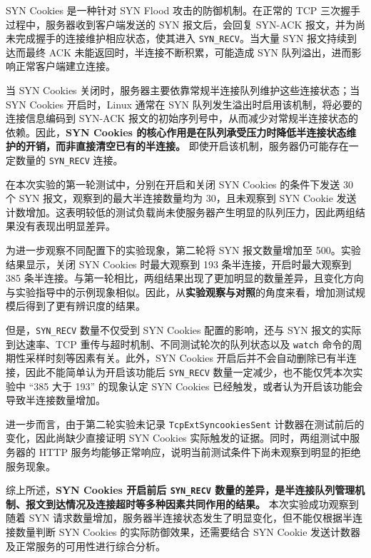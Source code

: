 SYN Cookies 是一种针对 SYN Flood 攻击的防御机制。在正常的 TCP 三次握手过程中，服务器收到客户端发送的 SYN 报文后，会回复 SYN-ACK 报文，并为尚未完成握手的连接维护相应状态，使其进入 \texttt{SYN\_RECV}。当大量 SYN 报文持续到达而最终 ACK 未能返回时，半连接不断积累，可能造成 SYN 队列溢出，进而影响正常客户端建立连接。

当 SYN Cookies 关闭时，服务器主要依靠常规半连接队列维护这些连接状态；当 SYN Cookies 开启时，Linux 通常在 SYN 队列发生溢出时启用该机制，将必要的连接信息编码到 SYN-ACK 报文的初始序列号中，从而减少对常规半连接状态的依赖。因此，\textbf{SYN Cookies 的核心作用是在队列承受压力时降低半连接状态维护的开销，而非直接清空已有的半连接。} 即使开启该机制，服务器仍可能存在一定数量的 \texttt{SYN\_RECV} 连接。

在本次实验的第一轮测试中，分别在开启和关闭 SYN Cookies 的条件下发送 30 个 SYN 报文，观察到的最大半连接数量均为 30，且未观察到 SYN Cookie 发送计数增加。这表明较低的测试负载尚未使服务器产生明显的队列压力，因此两组结果没有表现出明显差异。

为进一步观察不同配置下的实验现象，第二轮将 SYN 报文数量增加至 500。实验结果显示，关闭 SYN Cookies 时最大观察到 193 条半连接，开启时最大观察到 385 条半连接。与第一轮相比，两组结果出现了更加明显的数量差异，且变化方向与实验指导中的示例现象相似。因此，从\textbf{实验观察与对照}的角度来看，增加测试规模后得到了更有辨识度的结果。

但是，\texttt{SYN\_RECV} 数量不仅受到 SYN Cookies 配置的影响，还与 SYN 报文的实际到达速率、TCP 重传与超时机制、不同测试轮次的队列状态以及 \texttt{watch} 命令的周期性采样时刻等因素有关。此外，SYN Cookies 开启后并不会自动删除已有半连接，因此不能简单认为开启该功能后 \texttt{SYN\_RECV} 数量一定减少，也不能仅凭本次实验中 ``385 大于 193'' 的现象认定 SYN Cookies 已经触发，或者认为开启该功能会导致半连接数量增加。

进一步而言，由于第二轮实验未记录 \texttt{TcpExtSyncookiesSent} 计数器在测试前后的变化，因此尚缺少直接证明 SYN Cookies 实际触发的证据。同时，两组测试中服务器的 HTTP 服务均能够正常响应，说明当前测试条件下尚未观察到明显的拒绝服务现象。

综上所述，\textbf{SYN Cookies 开启前后 \texttt{SYN\_RECV} 数量的差异，是半连接队列管理机制、报文到达情况及连接超时等多种因素共同作用的结果。} 本次实验成功观察到随着 SYN 请求数量增加，服务器半连接状态发生了明显变化，但不能仅根据半连接数量判断 SYN Cookies 的实际防御效果，还需要结合 SYN Cookie 发送计数器及正常服务的可用性进行综合分析。
